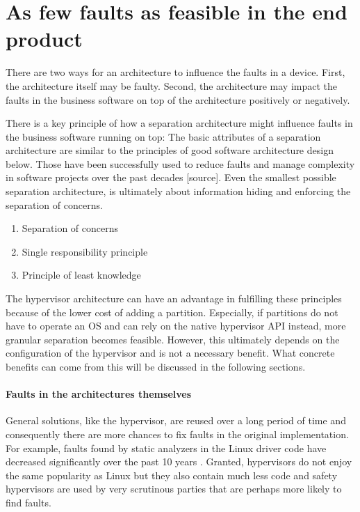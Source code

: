 
\section{As few faults as feasible in the end product}
There are two ways for an architecture to influence the faults in a device. First, the architecture itself may be faulty. Second, the architecture may impact the faults in the business software on top of the architecture positively or negatively.

There is a key principle of how a separation architecture might influence faults in the business software running on top: The basic attributes of a separation architecture are similar to the principles of good software architecture design below. Those have been successfully used to reduce faults and manage complexity in software projects over the past decades [source]. Even the smallest possible separation architecture, is ultimately about information hiding and enforcing the separation of concerns.
\begin{enumerate}
\item Separation of concerns
\item Single responsibility principle
\item Principle of least knowledge
\end{enumerate}
The hypervisor architecture can have an advantage in fulfilling these principles because of the lower cost of adding a partition. Especially, if partitions do not have to operate an OS and can rely on the native hypervisor \gls{API} instead, more granular separation becomes feasible. However, this ultimately depends on the configuration of the hypervisor and is not a necessary benefit.
What concrete benefits can come from this will be discussed in the following sections.
\paragraph{Faults in the architectures themselves}
General solutions, like the hypervisor, are reused over a long period of time and consequently there are more chances to fix faults in the original implementation. For example, faults found by static analyzers in the Linux driver code have decreased significantly over the past 10 years \cite{palix2011faults}. Granted, hypervisors do not enjoy the same popularity as Linux but they also contain much less code and safety hypervisors are used by very scrutinous  parties that are perhaps more likely to find faults.

